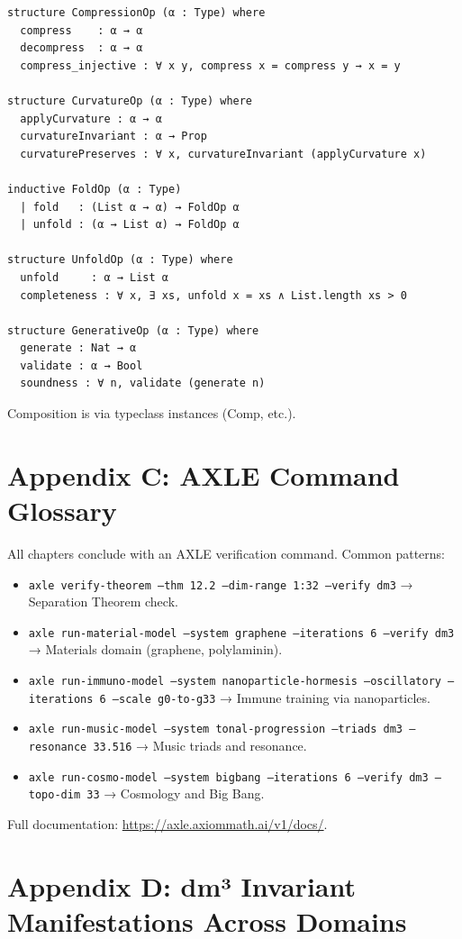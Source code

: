 \documentclass[19pt]{book}
\theoremstyle{plain}
\theoremstyle{definition}
\theoremstyle{remark}
\begin{document}
\begin{enumerate}
\begin{lstlisting}[language=Lean,caption={Core Operator Types}]
structure CompressionOp (α : Type) where
  compress    : α → α
  decompress  : α → α
  compress_injective : ∀ x y, compress x = compress y → x = y

structure CurvatureOp (α : Type) where
  applyCurvature : α → α
  curvatureInvariant : α → Prop
  curvaturePreserves : ∀ x, curvatureInvariant (applyCurvature x)

inductive FoldOp (α : Type)
  | fold   : (List α → α) → FoldOp α
  | unfold : (α → List α) → FoldOp α

structure UnfoldOp (α : Type) where
  unfold     : α → List α
  completeness : ∀ x, ∃ xs, unfold x = xs ∧ List.length xs > 0

structure GenerativeOp (α : Type) where
  generate : Nat → α
  validate : α → Bool
  soundness : ∀ n, validate (generate n)
\end{lstlisting}

Composition is via typeclass instances (Comp, etc.).

\chapter{Appendix C: AXLE Command Glossary}

All chapters conclude with an AXLE verification command. Common patterns:

\begin{itemize}
\item \texttt{axle verify-theorem --thm 12.2 --dim-range 1:32 --verify dm3}  
  → Separation Theorem check.
\item \texttt{axle run-material-model --system graphene --iterations 6 --verify dm3}  
  → Materials domain (graphene, polylaminin).
\item \texttt{axle run-immuno-model --system nanoparticle-hormesis --oscillatory --iterations 6 --scale g0-to-g33}  
  → Immune training via nanoparticles.
\item \texttt{axle run-music-model --system tonal-progression --triads dm3 --resonance 33.516}  
  → Music triads and resonance.
\item \texttt{axle run-cosmo-model --system bigbang --iterations 6 --verify dm3 --topo-dim 33}  
  → Cosmology and Big Bang.
\end{itemize}

Full documentation: \url{https://axle.axiommath.ai/v1/docs/}.

\chapter{Appendix D: dm³ Invariant Manifestations Across Domains}


\end{enumerate}
\end{document}
